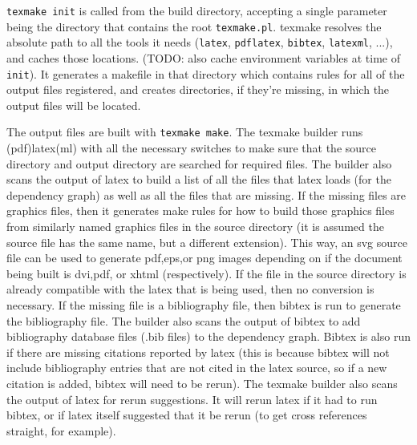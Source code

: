 \verb|texmake init| is called from the build directory, accepting a single parameter being the directory that contains the root \verb|texmake.pl|. 
%
texmake resolves the absolute path to all the tools it needs (\verb|latex|, \verb|pdflatex|, \verb|bibtex|, \verb|latexml|, ...), and caches those locations. 
%
(TODO: also cache environment variables at time of \verb|init|). 
%
It generates a makefile in that directory which contains rules for all of the output files registered, and creates directories, if they're missing, in which the output files will be located. 

The output files are built with \verb|texmake make|. The texmake builder runs (pdf)latex(ml) with all the necessary switches to make sure that the source directory and output directory are searched for required files. 
%
The builder also scans the output of latex to build a list of all the files that latex loads (for the dependency graph) as well as all the files that are missing. 
%
If the missing files are graphics files, then it generates make rules for how to build those graphics files from similarly named graphics files in the source directory (it is assumed the source file has the same name, but a different extension). 
%
This way, an svg source file can be used to generate pdf,eps,or png images depending on if the document being built is dvi,pdf, or xhtml (respectively). 
%
If the file in the source directory is already compatible with the latex that is being used, then no conversion is necessary. 
%
If the missing file is a bibliography file, then bibtex is run to generate the bibliography file. 
%
The builder also scans the output of bibtex to add bibliography database files (.bib files) to the dependency graph. 
%
Bibtex is also run if there are missing citations reported by latex (this is because bibtex will not include bibliography entries that are not cited in the latex source, so if a new citation is added, bibtex will need to be rerun). 
%
The texmake builder also scans the output of latex for rerun suggestions. 
%
It will rerun latex if it had to run bibtex, or if latex itself suggested that it be rerun (to get cross references straight, for example).




